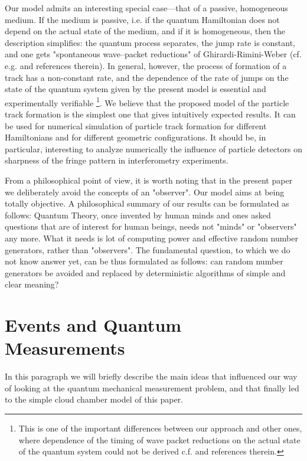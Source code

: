 \documentclass[12pt]{article}
\begin{document}
Our model admits an interesting special case---that of a passive,
homogeneous medium. If the medium is passive, i.e. if the quantum
Hamiltonian does not depend on the actual state of the medium, and if it is
homogeneous, then the description simplifies: the quantum process
separates, the jump rate is constant, and one gets "spontaneous
wave--packet reductions" of Ghirardi-Rimini-Weber (cf. e.g. \cite{ghi1}
and references therein). In general, however, the process of formation of a
track has a non-constant rate, and the dependence of the rate of jumps on
the state of the quantum system given by the present model is essential and
experimentally verifiable \footnote{This is one of the important
differences between our approach and other ones, where dependence of the
timing of wave packet reductions on the actual state of the quantum system
could not be derived c.f.\cite{cav1} and references therein.}. We
believe that the proposed model of the particle track formation is the
simplest one that gives intuitively expected results. It can be used for
numerical simulation of particle track formation for different Hamiltonians
and for different geometric configurations. It should be, in particular,
interesting to analyze numerically the influence of particle detectors on
sharpness of the fringe pattern in interferometry experiments.

From a philosophical point of view, it is worth noting that in the present
paper we deliberately avoid the concepts of an "observer". Our model aims
at being totally objective. A philosophical summary of our results can be
formulated as follows: Quantum Theory, once invented by human minds and
ones asked questions that are of interest for human beings, needs not
"minds" or "observers" any more. What it needs is lot of computing power
and effective random number generators, rather than "observers". The
fundamental question, to which we do not know answer yet, can be thus
formulated as follows: can random number generators be avoided and replaced
by deterministic algorithms of simple and clear meaning?

\section{Events and Quantum Measurements}
In this paragraph we will briefly describe the main ideas that influenced
our way of looking at the quantum mechanical measurement problem, and that
finally led to the simple cloud chamber model of this paper.
\end{document}

